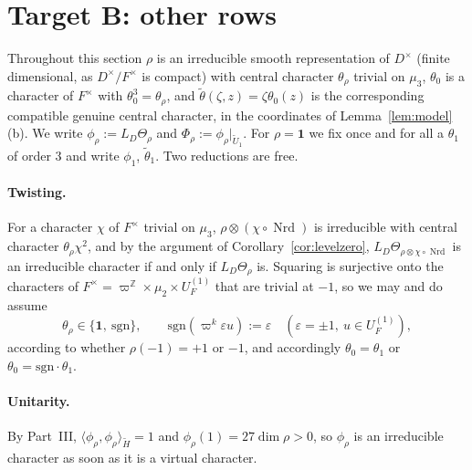 \documentclass[11pt]{article}
\newcommand{\Z}{\mathbb Z}
\newcommand{\Nrd}{\operatorname{Nrd}}
\newcommand{\tH}{\widetilde H}
\newcommand{\tU}{\widetilde U}
\newcommand{\tth}{\widetilde\theta}
\theoremstyle{plain}
\theoremstyle{definition}
\begin{document}
\section{Target B: other rows}\label{sec:plan}
Throughout this section $\rho$ is an irreducible smooth representation of
$D^\times$ (finite dimensional, as $D^\times/F^\times$ is compact) with
central character $\theta_\rho$ trivial on $\mu_3$, $\theta_0$ is a
character of $F^\times$ with $\theta_0^3=\theta_\rho$, and
$\tth(\zeta,z)=\zeta\theta_0(z)$ is the corresponding compatible genuine
central character, in the coordinates of Lemma~\ref{lem:model}(b).  We
write $\phi_\rho:=L_D\Theta_\rho$ and $\Phi_\rho:=\phi_\rho|_{\tU_1}$.
For $\rho=\mathbf1$ we fix once and for all a $\theta_1$ of order $3$
and write $\phi_1$, $\tth_1$.  Two reductions are free.

\paragraph{Twisting.}  For a character $\chi$ of $F^\times$ trivial on
$\mu_3$, $\rho\otimes(\chi\circ\Nrd)$ is irreducible with central
character $\theta_\rho\chi^2$, and by the argument of
Corollary~\ref{cor:levelzero}, $L_D\Theta_{\rho\otimes\chi\circ\Nrd}$ is
an irreducible character if and only if $L_D\Theta_\rho$ is.  Squaring
is surjective onto the characters of $F^\times=\varpi^{\Z}\times\mu_2\times U_F^{(1)}$
that are trivial at $-1$, so we may and do assume
\begin{equation}\label{eq:normalized-central}
 \theta_\rho\in\{\mathbf1,\ \mathrm{sgn}\},\qquad
 \mathrm{sgn}(\varpi^k\varepsilon u):=\varepsilon\quad(\varepsilon=\pm1,\ u\in U_F^{(1)}),
\end{equation}
according to whether $\rho(-1)=+1$ or $-1$, and accordingly
$\theta_0=\theta_1$ or $\theta_0=\mathrm{sgn}\cdot\theta_1$.

\paragraph{Unitarity.}  By Part~III, $\langle\phi_\rho,\phi_\rho\rangle_{\tH}=1$
and $\phi_\rho(1)=27\dim\rho>0$, so $\phi_\rho$ is an irreducible
character as soon as it is a virtual character.
\end{document}
